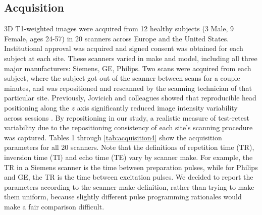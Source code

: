 \subsection{Acquisition}
3D T1-weighted images were acquired from 12 healthy subjects (3 Male, 9 Female, ages 24-57) in 20 scanners across Europe and the United States. Institutional approval was acquired and signed consent was obtained for each subject at each site. These scanners varied in make and model, including all three major manufacturers: Siemens, GE, Philips. Two scans were acquired from each subject, where the subject got out of the scanner between scans for a couple minutes, and was repositioned and rescanned by the scanning technician of that particular site. Previously, Jovicich and colleagues showed that reproducible head positioning along the $z$ axis significantly reduced image intensity variability across sessions \cite{freesurferReliability}. By repositioning in our study, a realistic measure of test-retest variability due to the repositioning consistency of each site's scanning procedure was captured. Tables 1 through \ref{tab:acquisition4} show the acquisition parameters for all 20 scanners. Note that the definitions of repetition time (TR), inversion time (TI) and echo time (TE) vary by scanner make. For example, the TR in a Siemens scanner is the time between preparation pulses, while for Philips and GE, the TR is the time between excitation pulses. We decided to report the parameters according to the scanner make definition, rather than trying to make them uniform, because slightly different pulse programming rationales would make a fair comparison difficult.